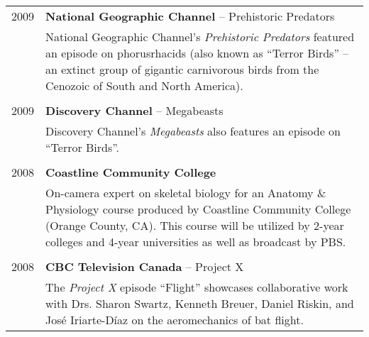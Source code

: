 \begin{longtable}{@{}lX@{}}
    2009 & \textbf{National Geographic Channel} -- Prehistoric Predators\\
    & National Geographic Channel's \emph{Prehistoric Predators} featured an episode on phorusrhacids (also known as ``Terror Birds'' -- an extinct group of gigantic carnivorous birds from the Cenozoic of South and North America).\\
    \\
    2009 & \textbf{Discovery Channel} -- Megabeasts\\
    & Discovery Channel's \emph{Megabeasts} also features an episode on ``Terror Birds''.\\
    \\
    2008 & \textbf{Coastline Community College}\\
    & On-camera expert on skeletal biology for an Anatomy \& Physiology course produced by Coastline Community College (Orange County, CA). This course will be utilized by 2-year colleges and 4-year universities as well as broadcast by PBS.\\
    \\
    2008 & \textbf{CBC Television Canada} -- Project X\\
    & The \emph{Project X} episode ``Flight'' showcases collaborative work with Drs. Sharon Swartz, Kenneth Breuer, Daniel Riskin, and Jos\'{e} Iriarte-D\'{i}az on the aeromechanics of bat flight.\\
\end{longtable}
